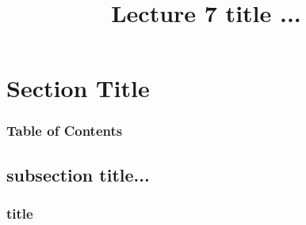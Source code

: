 \documentclass[xcolor=dvipsnames]{beamer}
\begin{document}
	\title[Lecture 7]{Lecture 7 title ...}
	\author[]{\className}
	\institute[\className]{\departmentName}
	\date{} 


	\begin{frame}
		\maketitle
	\end{frame}


\section{Section Title} 

	\begin{frame} \frametitle{Table of Contents}
		\tableofcontents[currentsection]
	\end{frame} 
	
	
	\subsection{subsection title...}
	
		\begin{frame} \frametitle{title}
	
		\end{frame}
\end{document}
